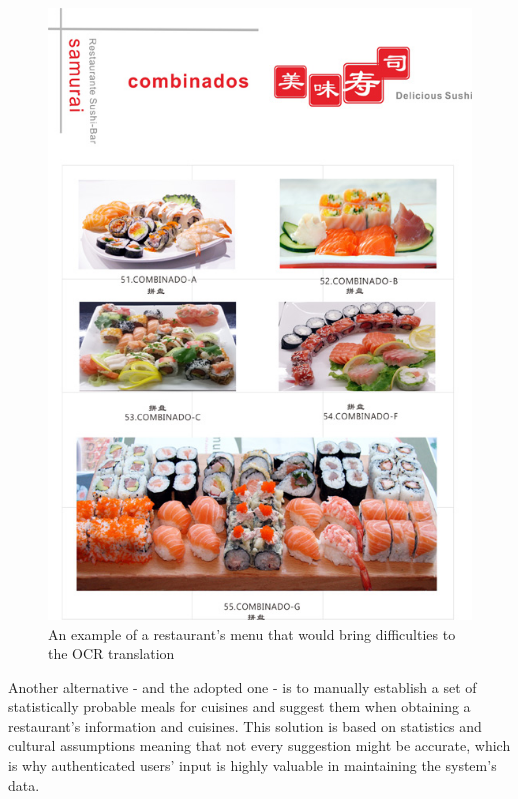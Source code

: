     \begin{figure}[H]
        \begin{center}
            \includegraphics[scale=0.4]{_figures/examplemenu.jpg}
            \caption{An example of a restaurant's menu that would bring difficulties to the OCR translation}
        \end{center}
    \end{figure}

    Another alternative - and the adopted one - is to manually establish a set of statistically probable meals for cuisines
    and suggest them when obtaining a restaurant's information and cuisines.
    This solution is based on statistics and cultural assumptions meaning that not every suggestion might be accurate, which is
    why authenticated users' input is highly valuable in maintaining the system's data.\\